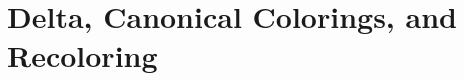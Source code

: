 \chapter{Delta, Canonical Colorings, and Recoloring}
\label{organized:delta}
\label{chapterfive}








